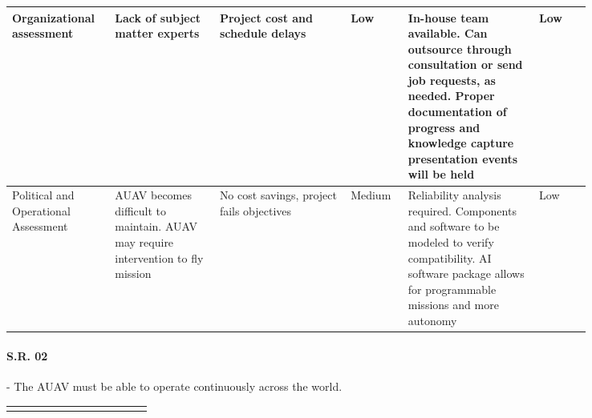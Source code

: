 \begin{fullwidth}
\begin{landscape}
{\begin{longtable}{| L{0.12\linewidth} | L{0.16\linewidth} |  L{0.20\linewidth} | L{0.08\linewidth} | L{0.20\linewidth} | L{0.08\linewidth} |}
        \hline
        Organizational assessment & Lack of subject matter experts & Project cost and schedule delays &  Low & In-house team available. \newline Can outsource through consultation or send job requests, as needed. \newline Proper documentation of progress and knowledge capture presentation events will be held &  Low \\
        \hline
        Political and Operational Assessment & AUAV becomes difficult to maintain. \newline AUAV may require intervention to fly mission & No cost savings, project fails objectives &  Medium & Reliability analysis required. \newline Components and software to be modeled to verify compatibility. \newline AI software package allows for programmable missions and more autonomy &  Low
        \label{tab:sr01_feasibility}
    \end{longtable}
    }
    
    
    \paragraph{S.R. 02} - The AUAV must be able to operate continuously across the world.
    
    {\fontsize{10pt}{11pt}\selectfont
    \begin{longtable}{| L{0.12\linewidth} | L{0.16\linewidth} |  L{0.20\linewidth} | L{0.08\linewidth} | L{0.20\linewidth} | L{0.08\linewidth} |}
        \hline \endlastfoot
        

\end{longtable}}
\end{landscape}
\end{fullwidth}
